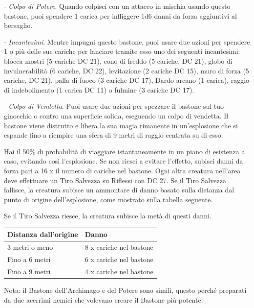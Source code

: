 \begin{multicols}{2}
- \emph{Colpo di Potere}. Quando colpisci con un attacco in mischia usando questo bastone, puoi spendere 1 carica per infliggere 1d6 danni da forza aggiuntivi al bersaglio.

- \emph{Incantesimi}. Mentre impugni questo bastone, puoi usare due azioni per spendere 1 o più delle sue cariche per lanciare tramite esso uno dei seguenti incantesimi: blocca mostri (5 cariche DC 21), cono di freddo (5 cariche, DC 21), globo di invulnerabilità (6 cariche, DC 22), levitazione (2 cariche DC 15), muro di forza (5 cariche, DC 21), palla di fuoco (3 cariche DC 17), Dardo arcano (1 carica), raggio di indebolimento (1 carica DC 11) o fulmine (3 cariche DC 17).

- \emph{Colpo di Vendetta}. Puoi usare due azioni per spezzare il bastone sul tuo ginocchio o contro una superficie solida, eseguendo un colpo di vendetta. Il bastone viene distrutto e libera la sua magia rimanente in un'esplosione che si espande fino a riempire una sfera di 9 metri di raggio centrata su di esso.

Hai il 50\% di probabilità di viaggiare istantaneamente in un piano di esistenza a caso, evitando così l'esplosione. Se non riesci a evitare l'effetto, subisci danni da forza pari a 16 x il numero di cariche nel bastone. Ogni altra creatura nell'area deve effettuare un Tiro Salvezza su Riflessi con DC 27. Se il Tiro Salvezza fallisce, la creatura subisce un ammontare di danno basato sulla distanza dal punto di origine dell'esplosione, come mostrato sulla tabella seguente.

Se il Tiro Salvezza riesce, la creatura subisce la metà di questi danni.

\medskip

\noindent\begin{tabularx}{0.49\textwidth}{ll}
	\toprule
\rowcolor{gray!20}\textbf{Distanza dall'origine} &\textbf{Danno}\\
\toprule
3 metri o meno &8 x cariche nel bastone\\
\rowcolor{gray!20}Fino a 6 metri& 6 x cariche nel bastone\\
Fino a 9 metri& 4 x cariche nel bastone
\end{tabularx}

\medskip

Nota: il Bastone dell'Archimago e del Potere sono simili, questo perché preparati da due acerrimi nemici che volevano creare il Bastone più potente.



\end{multicols}
